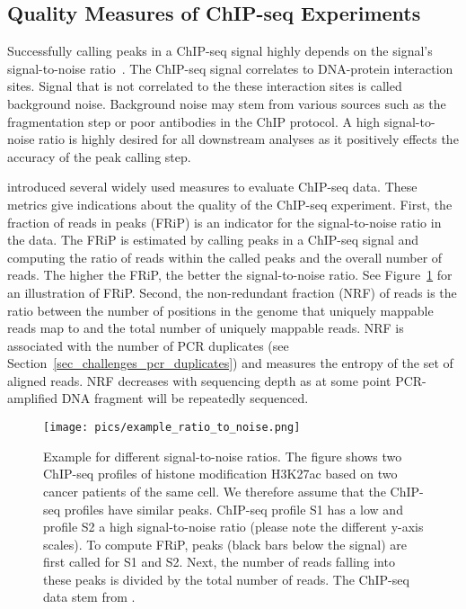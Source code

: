 \subsection{Quality Measures of ChIP-seq Experiments}
\label{sec_eval_chipseq_exp}
Successfully calling peaks in a ChIP-seq signal highly depends on the signal's signal-to-noise ratio~\citep{landt2012}.
The ChIP-seq signal correlates to DNA-protein interaction sites.
Signal that is not correlated to the these interaction sites is called background noise.
Background noise may stem from various sources such as the fragmentation step or poor antibodies in the ChIP protocol.
A high signal-to-noise ratio is highly desired for all downstream analyses as it positively effects the accuracy of the peak calling step.

\cite{landt2012} introduced several widely used measures to evaluate ChIP-seq data. 
These metrics give indications about the quality of the ChIP-seq experiment. 
First, the fraction of reads in peaks (FRiP) is an indicator for the signal-to-noise ratio in the data.
The FRiP is estimated by calling peaks in a ChIP-seq signal and computing the ratio of reads within the called peaks and the overall number of reads.
The higher the FRiP, the better the signal-to-noise ratio.
See Figure~\ref{pic_ratio_to_noise} for an illustration of FRiP.
Second, the non-redundant fraction (NRF) of reads is the ratio between the number of positions in the genome that uniquely mappable reads map to and the total number of uniquely mappable reads. 
NRF is associated with the number of PCR duplicates (see Section~\ref{sec_challenges_pcr_duplicates}) and measures the entropy of the set of aligned reads.
NRF decreases with sequencing depth as at some point PCR-amplified DNA fragment will be repeatedly sequenced.

\begin{figure}[ht]
  \centering
    \texttt{[image: pics/example\_ratio\_to\_noise.png]}
\caption[Example for different signal-to-noise ratios]{Example for different signal-to-noise ratios.
The figure shows two ChIP-seq profiles of histone modification H3K27ac based on two cancer patients of the same cell.
We therefore assume that the ChIP-seq profiles have similar peaks.
ChIP-seq profile S1 has a low and profile S2 a high signal-to-noise ratio (please note the different y-axis scales).
To compute FRiP, peaks (black bars below the signal) are first called for S1 and S2.
Next, the number of reads falling into these peaks is divided by the total number of reads.
The ChIP-seq data stem from \cite{Koues2015}.
}
\label{pic_ratio_to_noise}
\end{figure}



